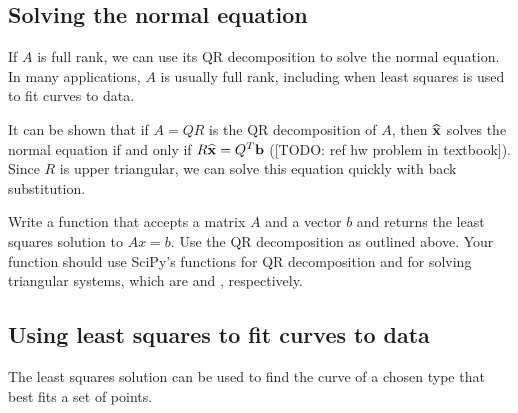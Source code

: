 \subsection*{Solving the normal equation}
If $A$ is full rank, we can use its QR decomposition to solve the normal equation. 
In many applications, $A$ is usually full rank, including when least squares is used to fit curves to data.

It can be shown that if $A=QR$ is the QR decomposition of $A$, then $\widehat{{\bf x}}$ solves the normal equation if and only if $R\widehat{{\bf x}} = Q^T {\bf b}$ ([TODO: ref hw problem in textbook]). 
Since $R$ is upper triangular, we can solve this equation quickly with back substitution. 

\begin{problem}
Write a function that accepts a matrix $A$ and a vector $b$ and returns the least squares solution to $Ax=b$.
Use the QR decomposition as outlined above.
Your function should use SciPy's functions for QR decomposition and for solving triangular systems, which are  and , respectively.
\end{problem}

\subsection*{Using least squares to fit curves to data}
The least squares solution can be used to find the curve of a chosen type that best fits a set of points. 

